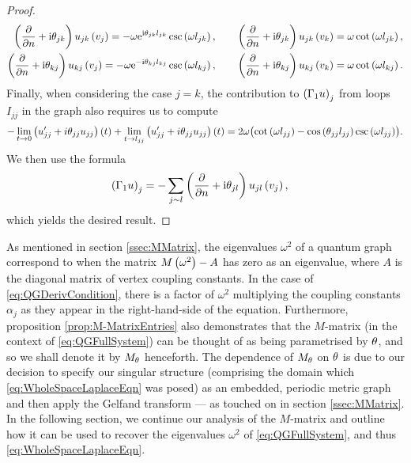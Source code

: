 \begin{proof}
\begin{align*}
		\left( \dfrac{\partial }{\partial n}+\mathrm{i}\theta_{jk} \right)u_{jk}\left( v_j \right) = -\omega \mathrm{e}^{\mathrm{i}\theta_{jk}l_{jk}}\csc\left( \omega l_{jk} \right), 
		&\qquad \left( \dfrac{\partial }{\partial n}+\mathrm{i}\theta_{jk} \right)u_{jk}\left( v_k \right) = \omega\cot\left( \omega l_{jk} \right), \\
		\left( \dfrac{\partial }{\partial n}+\mathrm{i}\theta_{kj} \right)u_{kj}\left( v_j \right) = -\omega \mathrm{e}^{-\mathrm{i}\theta_{kj}l_{kj}}\csc\left( \omega l_{kj} \right), 
		&\qquad \left( \dfrac{\partial }{\partial n}+\mathrm{i}\theta_{kj} \right)u_{kj}\left( v_k \right) = \omega\cot\left( \omega l_{kj} \right).
	\end{align*}
	Finally, when considering the case $j=k$, the contribution to $\left( \Gamma_1 u \right)_j$ from loops $I_{jj}$ in the graph also requires us to compute
	\begin{align*}
		-\lim_{t\rightarrow0}\left( u_{jj}'+i\theta_{jj}u_{jj} \right)(t) + \lim_{t\rightarrow l_{jj}}\left( u_{jj}'+i\theta_{jj}u_{jj} \right)(t)
		= 2\omega\bigl( \cot\left( \omega l_{jj} \right) - \cos\left( \theta_{jj}l_{jj} \right)\csc\left( \omega l_{jj} \right) \bigr).	
	\end{align*}
	We then use the formula
	\begin{align*}
		\left( \Gamma_1 u \right)_j &= -\sum_{j\sim l} \left( \dfrac{\partial }{\partial n}+\mathrm{i}\theta_{jl} \right)u_{jl}\left( v_j \right),
	\end{align*}
	which yields the desired result.
\end{proof}

As mentioned in section \ref{ssec:MMatrix}, the eigenvalues $\omega^2$ of a quantum graph correspond to when the matrix $M\left( \omega^2 \right) - A$ has zero as an eigenvalue, where $A$ is the diagonal matrix of vertex coupling constants.
In the case of \eqref{eq:QGDerivCondition}, there is a factor of $\omega^2$ multiplying the coupling constants $\alpha_j$ as they appear in the right-hand-side of the equation.
Furthermore, proposition \ref{prop:M-MatrixEntries} also demonstrates that the $M$-matrix (in the context of \eqref{eq:QGFullSystem}) can be thought of as being parametrised by $\theta$, and so we shall denote it by $M_{\theta}$ henceforth.
The dependence of $M_\theta$ on $\theta$ is due to our decision to specify our singular structure (comprising the domain which \eqref{eq:WholeSpaceLaplaceEqn} was posed) as an embedded, periodic metric graph and then apply the Gelfand transform --- as touched on in section \ref{ssec:MMatrix}.
In the following section, we continue our analysis of the $M$-matrix and outline how it can be used to recover the eigenvalues $\omega^2$ of \eqref{eq:QGFullSystem}, and thus \eqref{eq:WholeSpaceLaplaceEqn}.

